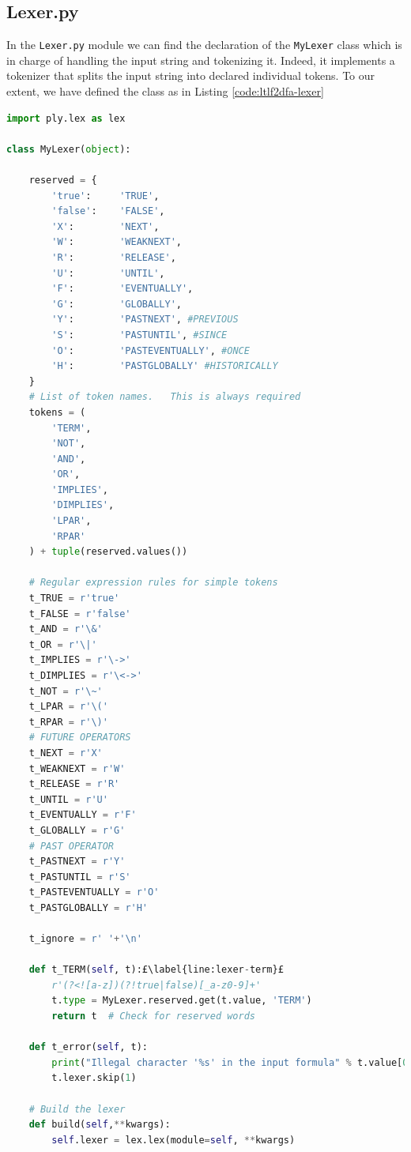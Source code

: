 \subsection{Lexer.py}\label{sec:lexer}
In the \texttt{Lexer.py} module we can find the declaration of the \texttt{MyLexer} class which is in charge of handling the input string and tokenizing it. Indeed, it implements a tokenizer that splits the input string into declared individual tokens.
To our extent, we have defined the class as in Listing \ref{code:ltlf2dfa-lexer}
\begin{lstlisting}[language=Python, style=Python, escapechar = £, label={code:ltlf2dfa-lexer}, caption={\texttt{Lexer.py} module}]
import ply.lex as lex

class MyLexer(object):

    reserved = {
        'true':     'TRUE',
        'false':    'FALSE',
        'X':        'NEXT',
        'W':        'WEAKNEXT',
        'R':        'RELEASE',        
        'U':        'UNTIL',
        'F':        'EVENTUALLY',
        'G':        'GLOBALLY',
        'Y':        'PASTNEXT', #PREVIOUS
        'S':        'PASTUNTIL', #SINCE
        'O':        'PASTEVENTUALLY', #ONCE
        'H':        'PASTGLOBALLY' #HISTORICALLY
    }
    # List of token names.   This is always required
    tokens = (
        'TERM',
        'NOT',
        'AND',
        'OR',
        'IMPLIES',
        'DIMPLIES',
        'LPAR',
        'RPAR'
    ) + tuple(reserved.values())

    # Regular expression rules for simple tokens
    t_TRUE = r'true'
    t_FALSE = r'false'
    t_AND = r'\&'
    t_OR = r'\|'
    t_IMPLIES = r'\->'
    t_DIMPLIES = r'\<->'
    t_NOT = r'\~'
    t_LPAR = r'\('
    t_RPAR = r'\)'
    # FUTURE OPERATORS
    t_NEXT = r'X'
    t_WEAKNEXT = r'W'
    t_RELEASE = r'R'    
    t_UNTIL = r'U'
    t_EVENTUALLY = r'F'
    t_GLOBALLY = r'G'
    # PAST OPERATOR
    t_PASTNEXT = r'Y'
    t_PASTUNTIL = r'S'
    t_PASTEVENTUALLY = r'O'
    t_PASTGLOBALLY = r'H'

    t_ignore = r' '+'\n'

    def t_TERM(self, t):£\label{line:lexer-term}£
        r'(?<![a-z])(?!true|false)[_a-z0-9]+'
        t.type = MyLexer.reserved.get(t.value, 'TERM')
        return t  # Check for reserved words

    def t_error(self, t):
        print("Illegal character '%s' in the input formula" % t.value[0])
        t.lexer.skip(1)

    # Build the lexer
    def build(self,**kwargs):
        self.lexer = lex.lex(module=self, **kwargs)
\end{lstlisting}
